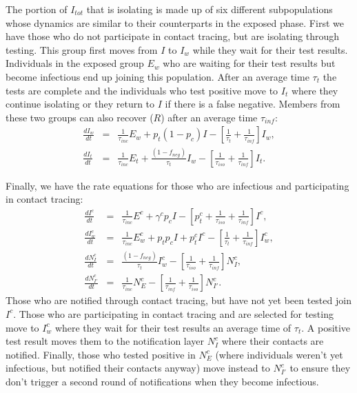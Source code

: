 \documentclass[notitlepage, superscriptaddress]{revtex4-2}
\begin{document}
The portion of $I_{tot}$ that is isolating is made up of six different subpopulations whose dynamics are similar to their counterparts in the exposed phase. First we have those who do not participate in contact tracing, but are isolating through testing. This group first moves from $I$ to $I_{w}$ while they wait for their test results. Individuals in the exposed group $E_{w}$ who are waiting for their test results but become infectious end up joining this population. After an average time $\tau_{t}$ the tests are complete and the individuals who test positive move to $I_{t}$ where they continue isolating or they return to $I$ if there is a false negative. Members from these two groups can also recover ($R$) after an average time $\tau_{inf}$:
\begin{eqnarray}
\label{E:dI_w}
\frac{dI_{w}}{dt} &=& \frac{1}{\tau_{inc}} E_{w} + p_{t} (1 - p_{c}) I - [\frac{1}{\tau_{t}}  + \frac{1}{\tau_{inf}}] I_{w}, \\
%
\frac{dI_{t}}{dt} &=& \frac{1}{\tau_{inc}} E_{t} + \frac{(1- f_{neg})}{\tau_{t}} I_{w} - [\frac{1}{\tau_{iso}}  + \frac{1}{\tau_{inf}}] I_{t}. 
\end{eqnarray}



Finally, we have the rate equations for those who are infectious and participating in contact tracing:
\begin{eqnarray}
\label{E:dIc}
 \frac{dI^{c}}{dt} &=& \frac{1}{\tau_{inc}} E^{c} + \gamma^{c} p_{c} I -[p^{c}_{t} +\frac{1}{\tau_{iso}} + \frac{1}{\tau_{inf}}] I^{c}, \\
 \frac{dI^{c}_{w}}{dt} &=& \frac{1}{\tau_{inc}} E^{c}_{w} + p_{t}p_{c} I + p^{c}_{t}I^{c} - [\frac{1}{\tau_{t}}  + \frac{1}{\tau_{inf}}] I^{c}_{w}, \\ 
 \frac{dN^{c}_{I}}{dt} &=&  \frac{(1-f_{neg})}{\tau_{t}} I^{c}_{w} - [\frac{1}{\tau_{iso}}  + \frac{1}{\tau_{inf}}] N^{c}_{I}, \\
 \frac{dN^{c}_{I'}}{dt} &=&  \frac{1}{\tau_{inc}} N^{c}_{E} - [\frac{1}{\tau_{inf}} + \frac{1}{\tau_{iso}}] N^{c}_{I'}.
\end{eqnarray}
Those who are notified through contact tracing, but have not yet been tested join $I^{c}$. Those who are participating in contact tracing and are selected for testing move to $I^{c}_{w}$ where they wait for their test results an average time of $\tau_{t}$. A positive test result moves them to the notification layer $N^{c}_{I}$ where their contacts are notified. Finally, those who tested positive in $N^{c}_{E}$ (where individuals weren't yet infectious, but notified their contacts anyway) move instead to $N^{c}_{I'}$ to ensure they don't trigger a second round of notifications when they become infectious.
\end{document}
